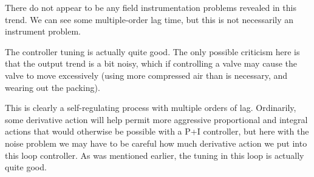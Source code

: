 \vskip 10pt

There do not appear to be any field instrumentation problems revealed in this trend.  We can see some multiple-order lag time, but this is not necessarily an instrument problem. 

\vskip 10pt
  
The controller tuning is actually quite good.  The only possible criticism here is that the output trend is a bit noisy, which if controlling a valve may cause the valve to move excessively (using more compressed air than is necessary, and wearing out the packing).

\vskip 10pt

This is clearly a self-regulating process with multiple orders of lag.  Ordinarily, some derivative action will help permit more aggressive proportional and integral actions that would otherwise be possible with a P+I controller, but here with the noise problem we may have to be careful how much derivative action we put into this loop controller.  As was mentioned earlier, the tuning in this loop is actually quite good.











